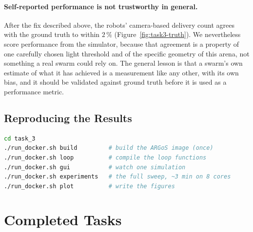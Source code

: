 \documentclass[12pt, a4paper]{article}
\begin{document}
\paragraph{Self-reported performance is not trustworthy in general.}
After the fix described above, the robots' camera-based delivery count agrees
with the ground truth to within $2\,\%$ (Figure~\ref{fig:task3-truth}).  We
nevertheless score performance from the simulator, because that agreement is a
property of one carefully chosen light threshold and of the specific geometry of
this arena, not something a real swarm could rely on.  The general lesson is
that a swarm's own estimate of what it has achieved is a measurement like any
other, with its own bias, and it should be validated against ground truth before
it is used as a performance metric.

\subsection{Reproducing the Results}

\begin{lstlisting}[language=bash]
cd task_3
./run_docker.sh build         # build the ARGoS image (once)
./run_docker.sh loop          # compile the loop functions
./run_docker.sh gui           # watch one simulation
./run_docker.sh experiments   # the full sweep, ~3 min on 8 cores
./run_docker.sh plot          # write the figures
\end{lstlisting}

\newpage
\section{Completed Tasks}
\end{document}
